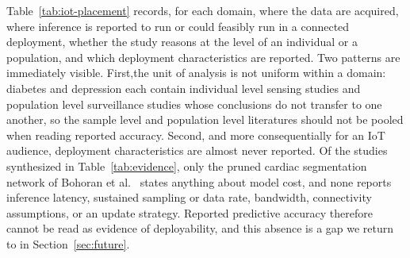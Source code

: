 \documentclass[journal]{IEEEtran}
\newif\ifsubmission
\begin{document}
\ifsubmission Reading the domains against the connected health lifecycle exposes two patterns. First,\else Table~\ref{tab:iot-placement} records, for each domain, where the data are acquired, where inference is reported to run or could feasibly run in a connected deployment, whether the study reasons at the level of an individual or a population, and which deployment characteristics are reported. Two patterns are immediately visible. First,\fi the unit of analysis is not uniform within a domain: diabetes and depression each contain individual level sensing studies and population level surveillance studies whose conclusions do not transfer to one another, so the sample level and population level literatures should not be pooled when reading reported accuracy. Second, and more consequentially for an IoT audience, deployment characteristics are almost never reported. Of the studies synthesized in Table~\ref{tab:evidence}, only the pruned cardiac segmentation network of Bohoran et al.~\cite{5} states anything about model cost, and none reports inference latency, sustained sampling or data rate, bandwidth, connectivity assumptions, or an update strategy. Reported predictive accuracy therefore cannot be read as evidence of deployability, and this absence is a gap we return to in Section~\ref{sec:future}.
\end{document}
